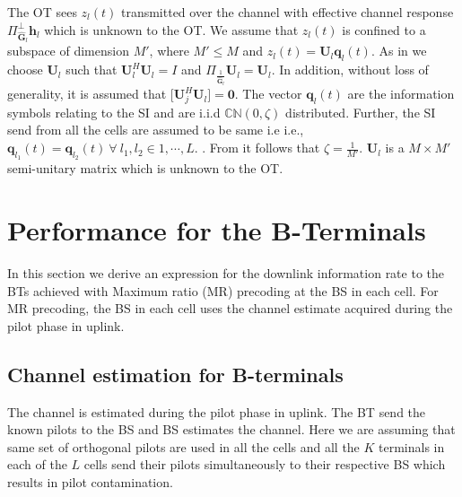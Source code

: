 \documentclass[10pt, a4paper, twoside,fleqn]{article}
\begin{document}
The OT sees $z_l(t)$ transmitted over the channel with effective channel response $\Pi^{\perp}_{\pmb{\hat{G}}_l}\pmb{h}_l$ which is unknown to the OT. We assume that $z_l(t)$ is confined to a subspace of dimension $M'$, where $M'\leq M$ and $z_l(t) = \pmb{U}_l\pmb{q}_l(t)$. As in \cite{bib:jbb} we choose $\pmb{U}_l$ such that $\pmb{U}_l^H\pmb{U}_l=I$ and $\Pi_{\frac{1}{\pmb{\hat G}_l}}\pmb{U}_l=\pmb{U}_l$. In addition, without loss of generality, it is assumed that [$\pmb{U}_j^H\pmb{U}_l]=\pmb{0}$. The vector $\pmb{q}_l(t)$ are the information symbols relating to the SI and are i.i.d ${\mathbb C}{\mathbb N}(0,\zeta)$ distributed. Further, the SI send from all the cells are assumed to be same i.e i.e., $\pmb{q}_{l_1}(t) = \pmb{q}_{l_2}(t) \ \forall \ l_1,l_2 \in {1 , \cdots, L}$. . From \cite{bib:jbb} it follows that $\zeta=\frac{1}{M'}$. $\pmb{U}_l$ is a $M\times M'$ semi-unitary matrix which is unknown to the OT.
\section{Performance for the B-Terminals}
In this section we derive an  expression for the downlink information rate to the BTs achieved with Maximum ratio (MR) precoding at the BS in each cell. For MR precoding, the BS in each cell uses the channel estimate acquired during the pilot phase in uplink.  

\subsection{Channel estimation for B-terminals} \label{sec:btchesti}
	The channel is estimated during the pilot phase in uplink. The BT send the known pilots to the BS and BS estimates the channel. Here we are assuming that same set of orthogonal pilots are used in all the cells and all the $K$ terminals in each of the $L$ cells send their pilots simultaneously to their respective BS which results in pilot contamination.
\end{document}
